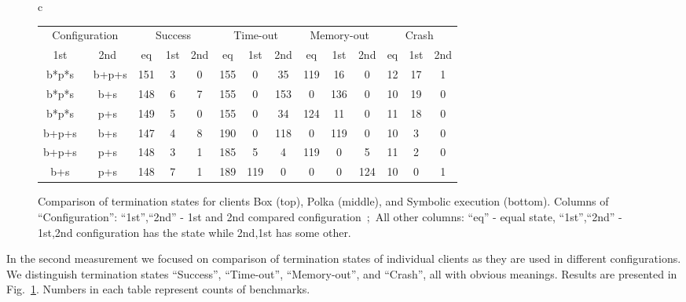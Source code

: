 \documentclass[envcountsame]{llncs}
\begin{document}
\begin{figure}[!htb]
\begin{center}
\begin{tabular}{c}
\begin{tabular}{|cc||ccc|ccc|ccc|ccc|}
\hline
\multicolumn{2}{|c||}{Configuration} &
\multicolumn{3}{c|}{Success} &
\multicolumn{3}{c|}{Time-out} &
\multicolumn{3}{c|}{Memory-out} &
\multicolumn{3}{c|}{Crash}
\\
1st & 2nd &
eq & 1st & 2nd &
eq & 1st & 2nd &
eq & 1st & 2nd &
eq & 1st & 2nd
\\ \hline
b*p*s & ~b+p+s & 
151 & 3 & 0 & 
155 & 0 & 35 & 
119 & 16 & 0 & 
12 & 17 & 1
\\
b*p*s & b+s & 
148 & 6 & 7 & 
155 & 0 & 153 & 
0 & 136 & 0 & 
10 & 19 & 0
\\
b*p*s & p+s & 
149 & 5 & 0 & 
155 & 0 & 34 & 
124 & 11 & 0 & 
11 & 18 & 0
\\
b+p+s & b+s & 
147 & 4 & 8 & 
190 & 0 & 118 & 
0 & 119 & 0 & 
10 & 3 & 0
\\
b+p+s & p+s & 
148 & 3 & 1 & 
185 & 5 & 4 & 
119 & 0 & 5 & 
11 & 2 & 0
\\
b+s & p+s & 
148 & 7 & 1 & 
189 & 119 & 0 & 
0 & 0 & 124 & 
10 & 0 & 1
\\
\hline
\end{tabular}
 \end{tabular}
\end{center}
\caption{Comparison of termination states for clients Box (top), Polka (middle),
and Symbolic execution (bottom). Columns of ``Configuration'': ``1st'',``2nd'' -
1st and 2nd compared configuration~;~All other columns: ``eq'' - equal state,
``1st'',``2nd'' - 1st,2nd configuration has the state while 2nd,1st has
some other.} \label{fig:Termination}
\end{figure}


In the second measurement we focused on comparison of termination states of
individual clients as they are used in different configurations. We distinguish
termination states ``Success'', ``Time-out'', ``Memory-out'', and ``Crash'', all
with obvious meanings. Results are presented in Fig.~\ref{fig:Termination}.
Numbers in each table represent counts of benchmarks.
\end{document}

